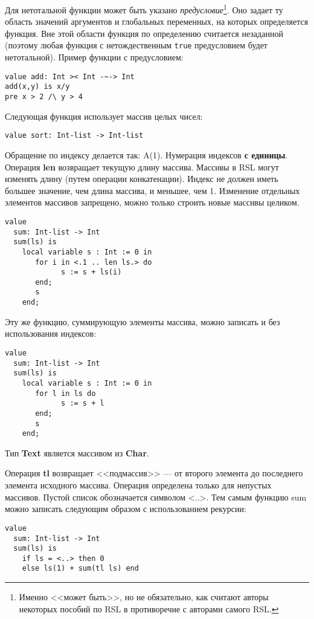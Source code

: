 Для нетотальной функции может быть указано \emph{предусловие}\footnote{Именно <<может быть>>, но не обязательно, как считают авторы некоторых пособий по RSL в противоречие с авторами самого RSL.}. Оно задает ту область значений аргументов и глобальных переменных, на которых определяется функция. Вне этой области функция по определению считается незаданной (поэтому любая функция с нетождественным \texttt{true} предусловием будет нетотальной). Пример функции с предусловием:
\begin{lstlisting}
value add: Int >< Int -~-> Int
add(x,y) is x/y
pre x > 2 /\ y > 4
\end{lstlisting}


Следующая функция использует массив целых чисел:
\begin{lstlisting}
value sort: Int-list -> Int-list
\end{lstlisting}

Обращение по индексу делается так: A(1). Нумерация индексов \textbf{с единицы}. Операция \textbf{len} возвращает текущую длину массива. Массивы в RSL могут изменять длину (путем операции конкатенации). Индекс не должен иметь большее значение, чем длина массива, и меньшее, чем 1. Изменение отдельных элементов массивов запрещено, можно только строить новые массивы целиком.

\begin{lstlisting}
value
  sum: Int-list -> Int
  sum(ls) is
    local variable s : Int := 0 in
       for i in <.1 .. len ls.> do
             s := s + ls(i)
       end;
       s
    end;
\end{lstlisting}


Эту же функцию, суммирующую элементы массива, можно записать и без использования индексов:
\begin{lstlisting}
value
  sum: Int-list -> Int
  sum(ls) is
    local variable s : Int := 0 in
       for l in ls do
             s := s + l
       end;
       s
    end;
\end{lstlisting}

Тип \textbf{Text} является массивом из \textbf{Char}.

Операция \textbf{tl} возвращает <<подмассив>> --- от второго элемента до последнего элемента исходного массива. Операция определена только для непустых массивов. Пустой список обозначается символом <..>. Тем самым функцию sum можно записать следующим образом с использованием рекурсии:
\begin{lstlisting}
value
  sum: Int-list -> Int
  sum(ls) is
    if ls = <..> then 0
    else ls(1) + sum(tl ls) end
\end{lstlisting}


